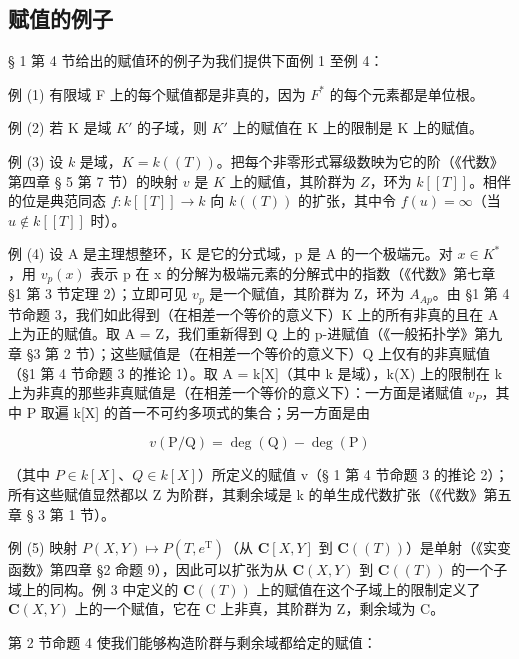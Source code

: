 \subsection{赋值的例子}

§ 1 第 4 节给出的赋值环的例子为我们提供下面例 1 至例 4：

例 (1) 有限域 F 上的每个赋值都是非真的，因为 \(F^{*}\) 的每个元素都是单位根。

例 (2) 若 K 是域 \(K'\) 的子域，则 \(K'\) 上的赋值在 K 上的限制是 K 上的赋值。

例 (3) 设 \(k\) 是域，\(K = k((T))\)。把每个非零形式幂级数映为它的阶（《代数》第四章 § 5 第 7 节）的映射 \(v\) 是 \(K\) 上的赋值，其阶群为 \(Z\)，环为 \(k[[T]]\)。相伴的位是典范同态 \(f: k[[T]] \to k\) 向 \(k((T))\) 的扩张，其中令 \(f(u) = \infty\)（当 \(u \notin k[[T]]\) 时）。

例 (4) 设 A 是主理想整环，K 是它的分式域，p 是 A 的一个极端元。对 \(x \in K^{*}\)，用 \(v_{p}(x)\) 表示 p 在 x 的分解为极端元素的分解式中的指数（《代数》第七章 §1 第 3 节定理 2）；立即可见 \(v_{p}\) 是一个赋值，其阶群为 Z，环为 \(A_{Ap}\)。由 §1 第 4 节命题 3，我们如此得到（在相差一个等价的意义下）K 上的所有非真的且在 A 上为正的赋值。取 A = Z，我们重新得到 Q 上的 p-进赋值（《一般拓扑学》第九章 §3 第 2 节）；这些赋值是（在相差一个等价的意义下）Q 上仅有的非真赋值（§1 第 4 节命题 3 的推论 1）。取 A = k{[}X{]}（其中 k 是域），k(X) 上的限制在 k 上为非真的那些非真赋值是（在相差一个等价的意义下）：一方面是诸赋值 \(v_{P}\)，其中 P 取遍 k{[}X{]} 的首一不可约多项式的集合；另一方面是由

\[
v (\mathrm{P} / \mathrm{Q}) = \deg (\mathrm{Q}) - \deg (\mathrm{P})
\]

（其中 \(P \in k[X]\)、\(Q \in k[X]\)）所定义的赋值 v（§ 1 第 4 节命题 3 的推论 2）；所有这些赋值显然都以 Z 为阶群，其剩余域是 k 的单生成代数扩张（《代数》第五章 § 3 第 1 节）。

例 (5) 映射 \(P(X, Y) \mapsto P(T, e^{\mathrm{T}})\)（从 \(\mathbf{C}[X, Y]\) 到 \(\mathbf{C}((T))\)）是单射（《实变函数》第四章 §2 命题 9），因此可以扩张为从 \(\mathbf{C}(X, Y)\) 到 \(\mathbf{C}((T))\) 的一个子域上的同构。例 3 中定义的 \(\mathbf{C}((T))\) 上的赋值在这个子域上的限制定义了 \(\mathbf{C}(X, Y)\) 上的一个赋值，它在 C 上非真，其阶群为 Z，剩余域为 C。

第 2 节命题 4 使我们能够构造阶群与剩余域都给定的赋值：

